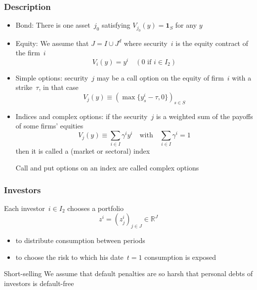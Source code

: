 \documentclass[blue]{beamer}
\def\R{\mathbb{R}}
\def\1{\mathbf{1}}
\theoremstyle{definition}
\theoremstyle{example}
\begin{document}

\begin{frame}\frametitle{Description}

\begin{small}
\begin{itemize}
\item \alert{Bond}: There is one asset~$j_0$ satisfying $V_{j_0}(y) = \1_S$ for any $y$
\item \alert{Equity}: We assume that $J=I \cup J^d$ where security~$i$ is the equity contract of the firm~$i$
\[
V_i(y) = y^i \quad  (0 \textrm{ if } i\in I_2)
\]
\item \alert{Simple options}: security~$j$ may be a call option on the equity of firm~$i$ with a strike~$\tau$, in that case
\[
V_j(y) \equiv (\max\{y^i_s-\tau,0\})_{s\in S}
\]
\item \alert{Indices and complex options}: if the security~$j$ is a weighted sum of the payoffs of some firms' equities
\[
V_j(y) \equiv \sum_{i\in I} \gamma^i y^i \quad \textrm{with} \quad \sum_{i\in I} \gamma^i =1
\]
then it is called a (market or sectoral) index

Call and put options on an index are called complex options
\end{itemize}
\end{small}
\end{frame}


\begin{frame}\frametitle{Investors}

Each investor~$i\in I_2$ chooses a portfolio
\[
z^i =(z^i_j)_{j\in J} \in \R^J
\]
\begin{itemize}
\item to distribute consumption between periods
\item to choose the risk to which his date~$t=1$ consumption is exposed
\end{itemize}

\begin{block}{Short-selling}
We assume that default penalties are so harsh that personal debts of investors is default-free
\end{block}

\end{frame}

\end{document}
